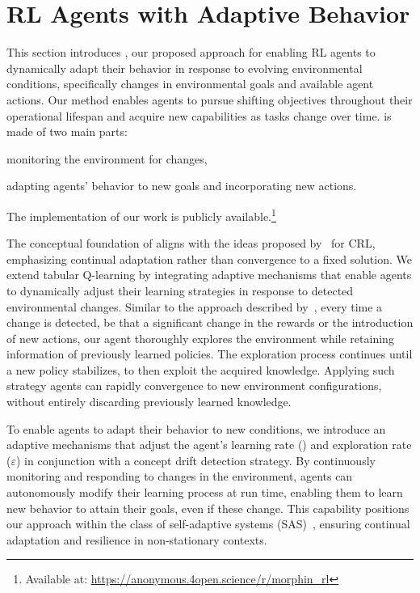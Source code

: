 
\section{\ac{RL} Agents with Adaptive Behavior}
\label{sec:implementation}

This section introduces \adaptiverl, our proposed approach for enabling \ac{RL} agents to 
dynamically adapt their behavior in response to evolving environmental conditions, specifically 
changes in environmental goals and available agent actions. Our method enables agents to 
pursue shifting objectives throughout their operational lifespan and acquire new capabilities as 
tasks change over time. \adaptiverl is made of two main parts:
\begin{enumerate*}[label=(\arabic*)]
\item monitoring the environment for changes,
\item adapting agents' behavior to new goals and incorporating new actions.
\end{enumerate*}
The implementation of our work is publicly available.\footnote{Available at: \url{https://anonymous.4open.science/r/morphin_rl}}

The conceptual foundation of \adaptiverl aligns with the ideas proposed 
by~\citet{abel2023definitioncontinualreinforcementlearning} for \ac{CRL}, emphasizing continual 
adaptation rather than convergence to a fixed solution. We extend tabular Q-learning by integrating 
adaptive mechanisms that enable agents to dynamically adjust their learning strategies in response 
to detected environmental changes. Similar to the approach described 
by~\citet{norman2024firstexploreexploitmetalearningsolve}, every time a change is detected, be that 
a significant change in the rewards or the introduction of new actions, our agent thoroughly explores 
the environment while retaining information of previously learned policies. The exploration process 
continues until a new policy stabilizes, to then exploit the acquired knowledge. Applying such 
strategy agents can rapidly convergence to new environment configurations, without entirely 
discarding previously learned knowledge.

To enable agents to adapt their behavior to new conditions, we introduce an adaptive mechanisms 
that adjust the agent's learning rate (\lrate{\alpha}) and exploration rate ($\varepsilon$) in conjunction 
with a concept drift detection strategy. By continuously monitoring and responding to changes in the 
environment, agents can autonomously modify their learning process at run time, enabling them 
to learn new behavior to attain their goals, even if these change. This capability positions our 
approach within the class of self-adaptive systems (SAS)~\cite{sasreview}, ensuring continual 
adaptation and resilience in non-stationary contexts.

